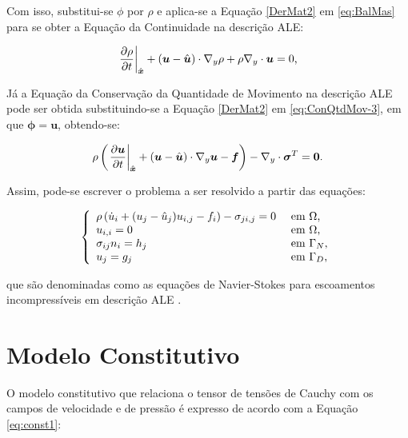 Com isso, substitui-se $\phi$ por $\rho$ e aplica-se a Equação \ref{DerMat2} em \ref{eq:BalMas} para se obter a Equação da Continuidade na descrição ALE:

\begin{equation}
    \left.\frac{\partial{\rho}}{\partial{t}}\right|_{\hat{\boldsymbol{x}}}+(\boldsymbol{u}-\hat{\boldsymbol{u}})\cdot\boldsymbol{}{\nabla_y}\rho+\rho\boldsymbol{}{\nabla_y}\cdot\boldsymbol{u}=0\text{,}
    \label{ConMas4}
\end{equation}

Já a Equação da Conservação da Quantidade de Movimento na descrição ALE pode ser obtida substituindo-se a Equação \ref{DerMat2} em \ref{eq:ConQtdMov-3}, em que $\mathbf{\phi}=\mathbf{u}$, obtendo-se:

\begin{equation}
    \rho\left(\left.\frac{\partial{\boldsymbol{u}}}{\partial{t}}\right|_{\hat{\boldsymbol{x}}}+(\boldsymbol{u}-\hat{\boldsymbol{u}})\cdot\boldsymbol{}{\nabla_y}\boldsymbol{u}-\boldsymbol{f}\right)-\boldsymbol{}{\nabla_y}\cdot\boldsymbol{\sigma}^T=\boldsymbol{0}\text{.}
    \label{ConQtdMov10}
\end{equation}

Assim, pode-se escrever o problema a ser resolvido a partir das equações:

\begin{equation}
    \left\{
    \begin{array}{ll}
        \rho\left({\dot{u}_i+(u_j-\hat{u}_j)u_{i,j}-f_i}\right)-\sigma_{ji,j}=0 & \text{ em }\Omega\text{,}   \\
        u_{i,i}=0                                                         & \text{ em }\Omega\text{,}   \\
        \sigma_{ij}n_i=h_j                                                & \text{ em }\Gamma_N\text{,} \\
        u_j=g_j                                                           & \text{ em }\Gamma_D\text{,}
    \end{array}
    \right.\label{eq:NS-ALE}
\end{equation}

\noindent que são denominadas como as equações de Navier-Stokes para escoamentos incompressíveis em descrição ALE \cite{bazilevs2013computational}.

\section{Modelo Constitutivo} \label{MC}

O modelo constitutivo que relaciona o tensor de tensões de Cauchy com os campos de velocidade e de pressão é expresso de acordo com a Equação \ref{eq:const1}:

